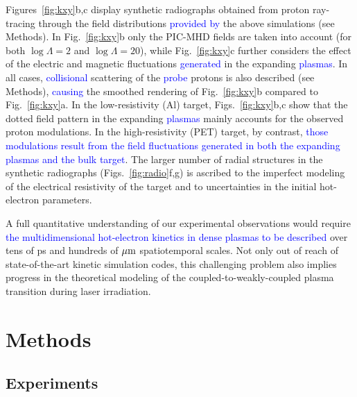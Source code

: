 \documentclass[aps,showpacs,superscriptaddress]{revtex4}
\begin{document}
Figures~\ref{fig:kxy}b,c display synthetic radiographs obtained from proton ray-tracing through the field distributions \textcolor{blue}{provided by} the above simulations (see Methods). In Fig.~\ref{fig:kxy}b only the PIC-MHD fields are taken into account (for both $\log \Lambda =2$ and $\log \Lambda = 20$), while Fig.~\ref{fig:kxy}c further considers the effect of the electric and magnetic fluctuations \textcolor{blue}{generated} in the expanding \textcolor{blue}{plasmas}. In all cases, \textcolor{blue}{collisional} scattering of the \textcolor{blue}{probe} protons is also described (see Methods), \textcolor{blue}{causing} the smoothed rendering of Fig.~\ref{fig:kxy}b compared to Fig.~\ref{fig:kxy}a. In the low-resistivity (Al) target,  Figs.~\ref{fig:kxy}b,c show that the dotted field pattern in the expanding \textcolor{blue}{plasmas} mainly accounts for the observed proton modulations. In the high-resistivity (PET) target, by contrast, \textcolor{blue}{those modulations result from the field fluctuations generated in both the expanding plasmas and the bulk target}. The larger number of radial structures in the synthetic radiographs (Figs.~\ref{fig:radio}f,g) is ascribed to the imperfect modeling of the electrical resistivity of the target and to uncertainties in the initial hot-electron parameters.

A full quantitative understanding of our experimental observations would require \textcolor{blue}{the multidimensional hot-electron kinetics in dense plasmas to be described} over tens of ps and hundreds of $\rm \mu m$ spatiotemporal scales. Not only out of reach of state-of-the-art kinetic simulation codes, this challenging problem also implies progress in the theoretical modeling of the coupled-to-weakly-coupled plasma transition during laser irradiation.


\section*{Methods}
\subsection*{Experiments}
\end{document}
